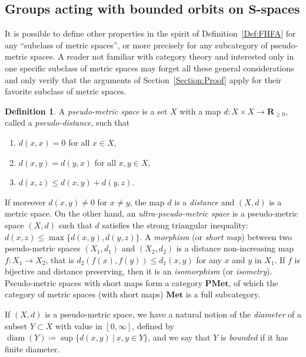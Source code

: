 \documentclass[a4paper]{article}
\theoremstyle{definition}
\newtheorem{defn}[lem]{Definition}
\DeclareMathOperator\diam{diam}
\newcommand*{\field}[1]{\mathbf{#1}}
\newcommand*{\category}[1]{\textbf{#1}}
\newcommand*{\PMet}{\category{PMet}}
\newcommand*{\R}{\field{R}}
\newcommand{\setst}[2]{\{#1\ |\ #2\}}
\begin{document}
\subsection{Groups acting with bounded orbits on \texorpdfstring{$\category S$}{\textbf{S}}-spaces}
It is possible to define other properties in the spirit of Definition~\ref{Def:FHFA} for any ``subclass of metric spaces'', or more precisely for any subcategory of pseudo-metric spaces.
A reader not familiar with category theory and interested only in one specific subclass of metric spaces may forget all these general considerations and only verify that the arguments of Section~\ref{Section:Proof} apply for their favorite subclass of metric spaces.
%
%
\begin{defn}\label{Def:Distance}
A \emph{pseudo-metric space} is a set $X$ with a map $d\colon X\times X\to \R_{\geq0}$, called a \emph{pseudo-distance}, such that
\begin{enumerate}
\item $d(x,x)=0$ for all $x\in X$,
\item $d(x,y)=d(y,x)$ for all $x,y \in X$,
\item $d(x,z)\leq d(x,y)+d(y,z)$.
\end{enumerate}
\end{defn}
%
%
If moreover $d(x,y)\neq 0$ for $x\neq y$, the map $d$ is a \emph{distance} and $(X,d)$ is a metric space.
On the other hand, an \emph{ultra-pseudo-metric space} is a pseudo-metric space $(X,d)$ such that $d$ satisfies the strong triangular inequality: $d(x,z)\leq \max\{d(x,y),d(y,z)\}$.
A \emph{morphism} (or \emph{short map}) between two pseudo-metric spaces $(X_1,d_1)$ and $(X_2,d_2)$ is a distance non-increasing map $f\colon X_1\to X_2$, that is $d_2(f(x),f(y))\leq d_1(x,y)$ for any $x$ and $y$ in $X_1$.
If $f$ is bijective and distance preserving, then it is an \emph{isomorphism} (or \emph{isometry}).
Pseudo-metric spaces with short maps form a category $\PMet$, of which the category of metric spaces (with short maps) $\category{Met}$ is a full subcategory.

If $(X,d)$ is a pseudo-metric space, we have a natural notion of the  \emph{diameter} of a subset $Y\subset X$ with value in $[0,\infty]$, defined by $\diam(Y)\coloneqq\sup\setst{d(x,y)}{x,y\in Y}$, and we say that $Y$ is \emph{bounded} if it has finite diameter.
%
%
\end{document}
